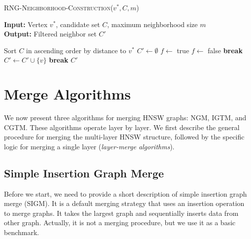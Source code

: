 \documentclass{article}
\begin{document}
\begin{algorithm}
\caption{\textsc{RNG-Neighborhood-Construction}($v^*, C, m$)}\label{alg:rngstrategy}
\textbf{Input:} Vertex $v^*$, candidate set $C$, maximum neighborhood size $m$ \\
\textbf{Output:} Filtered neighbor set $C'$
\begin{algorithmic}[1]
\State Sort $C$ in ascending order by distance to $v^*$
\State $C' \gets \emptyset$
    \State $f \gets$ true
            \State $f \gets$ false
            \State \textbf{break}
        \EndIf
    \EndFor
        \State $C' \gets C' \cup \{v\}$
    \EndIf
        \State \textbf{break}
    \EndIf
\EndFor
\State \Return $C'$
\end{algorithmic}
\end{algorithm}

\section{Merge Algorithms}
\label{sec:merge}

We now present three algorithms for merging HNSW graphs: \textsc{NGM}, \textsc{IGTM}, and \textsc{CGTM}. These algorithms operate layer by layer. We first describe the general procedure for merging the multi-layer HNSW structure, followed by the specific logic for merging a single layer (\textit{layer-merge algorithms}).

\subsection{Simple Insertion Graph Merge}
Before we start, we need to provide a short description of simple insertion graph merge (SIGM). It is a default merging strategy that uses an insertion operation to merge graphs. It takes the largest graph and sequentially inserts data from other graph. Actually, it is not a merging procedure, but we use it as a basic benchmark.
\end{document}
